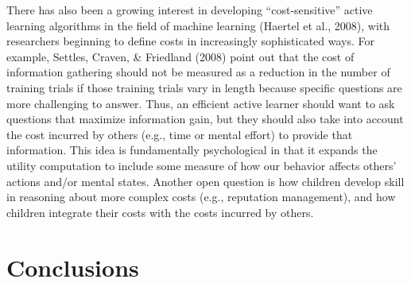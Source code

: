 \documentclass[oneside]{report}
\begin{document}
There has also been a growing interest in developing ``cost-sensitive''
active learning algorithms in the field of machine learning (Haertel et
al., 2008), with researchers beginning to define costs in increasingly
sophisticated ways. For example, Settles, Craven, \& Friedland (2008)
point out that the cost of information gathering should not be measured
as a reduction in the number of training trials if those training trials
vary in length because specific questions are more challenging to
answer. Thus, an efficient active learner should want to ask questions
that maximize information gain, but they should also take into account
the cost incurred by others (e.g., time or mental effort) to provide
that information. This idea is fundamentally psychological in that it
expands the utility computation to include some measure of how our
behavior affects others' actions and/or mental states. Another open
question is how children develop skill in reasoning about more complex
costs (e.g., reputation management), and how children integrate their
costs with the costs incurred by others.

\section{Conclusions}\label{conclusions}
\end{document}

